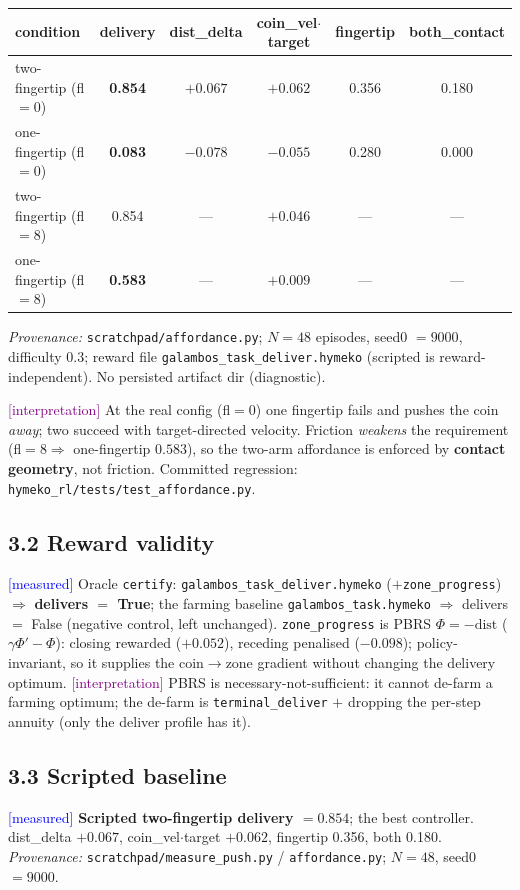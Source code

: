 \documentclass[11pt]{article}
\newcommand{\meas}{\textcolor{blue}{[measured]}}
\newcommand{\interp}{\textcolor{purple}{[interpretation]}}
\newcommand{\fn}[1]{\texttt{#1}}
\begin{document}
\begin{center}\begin{tabular}{lccccc}
\toprule
condition & delivery & dist\_delta & coin\_vel$\cdot$target & fingertip & both\_contact\\
\midrule
two-fingertip (fl$=0$) & \textbf{0.854} & $+0.067$ & $+0.062$ & 0.356 & 0.180\\
one-fingertip (fl$=0$) & \textbf{0.083} & $-0.078$ & $-0.055$ & 0.280 & 0.000\\
two-fingertip (fl$=8$) & 0.854 & --- & $+0.046$ & --- & ---\\
one-fingertip (fl$=8$) & \textbf{0.583} & --- & $+0.009$ & --- & ---\\
\bottomrule
\end{tabular}\end{center}
\emph{Provenance:} \fn{scratchpad/affordance.py}; $N=48$ episodes, seed0 $=9000$, difficulty $0.3$; reward file
\fn{galambos\_task\_deliver.hymeko} (scripted is reward-independent). No persisted artifact dir (diagnostic).

\interp{} At the real config (fl$=0$) one fingertip fails and pushes the coin \emph{away}; two succeed with
target-directed velocity. Friction \emph{weakens} the requirement (fl$=8 \Rightarrow$ one-fingertip $0.583$), so
the two-arm affordance is enforced by \textbf{contact geometry}, not friction. Committed regression:
\fn{hymeko\_rl/tests/test\_affordance.py}.

\subsection*{3.2 Reward validity}
\meas{} Oracle \fn{certify}: \fn{galambos\_task\_deliver.hymeko} ($+$\fn{zone\_progress}) $\Rightarrow$
\textbf{delivers $=$ True}; the farming baseline \fn{galambos\_task.hymeko} $\Rightarrow$ delivers $=$ False
(negative control, left unchanged). \fn{zone\_progress} is PBRS $\Phi=-\text{dist}$ ($\gamma\Phi'-\Phi$): closing
rewarded ($+0.052$), receding penalised ($-0.098$); policy-invariant, so it supplies the coin$\to$zone gradient
without changing the delivery optimum. \interp{} PBRS is necessary-not-sufficient: it cannot de-farm a farming
optimum; the de-farm is \fn{terminal\_deliver} $+$ dropping the per-step annuity (only the deliver profile has it).

\subsection*{3.3 Scripted baseline}
\meas{} \textbf{Scripted two-fingertip delivery $=0.854$}; the best controller. dist\_delta $+0.067$,
coin\_vel$\cdot$target $+0.062$, fingertip 0.356, both 0.180.
\emph{Provenance:} \fn{scratchpad/measure\_push.py} / \fn{affordance.py}; $N=48$, seed0 $=9000$.
\end{document}
